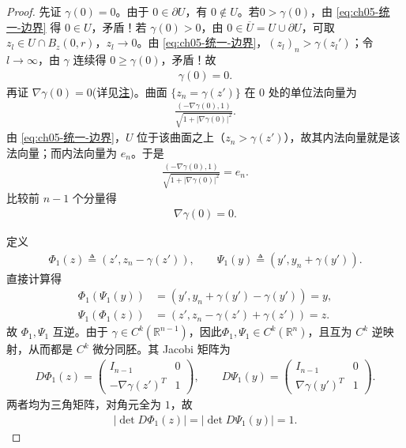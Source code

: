 \documentclass[../../main.tex]{subfiles}
\begin{document}
\begin{proof}
先证 $\gamma(0)=0$。由于 $0\in\partial U$，有 $0\notin U$。若$0>\gamma(0)$，由 \eqref{eq:ch05-统一-边界} 得 $0\in U$，矛盾！若 $\gamma(0)>0$，由 $0\in\overline{U}=U\cup \partial U$，可取 $z_l\in U\cap B_z(0,r)$，$z_l\to0$。由 \eqref{eq:ch05-统一-边界}，$(z_l)_n>\gamma(z_l')$；令 $l\to\infty$，由 $\gamma$ 连续得 $0\geqslant\gamma(0)$，矛盾！故
\begin{align}
\gamma(0)=0.
\label{eq:ch05-统一-gamma0}
\end{align}
再证 $\nabla\gamma(0)=0$(详见\hyperref[曲面的单位法向量选取]{注})。曲面 $\{z_n=\gamma(z')\}$ 在 $0$ 处的单位法向量为
\begin{align*}
\frac{(-\nabla\gamma(0),1)}{\sqrt{1+|\nabla\gamma(0)|^{2}}}.
\end{align*}
由 \eqref{eq:ch05-统一-边界}，$U$ 位于该曲面之上（$z_n>\gamma(z')$），故其内法向量就是该法向量；而内法向量为 $e_n$。于是
\begin{align*}
\frac{(-\nabla\gamma(0),1)}{\sqrt{1+|\nabla\gamma(0)|^{2}}}=e_n.
\end{align*}
比较前 $n-1$ 个分量得
\begin{align}
\nabla\gamma(0)=0.
\label{eq:ch05-统一-gradgamma0}
\end{align}

定义
\begin{align*}
\Phi_1(z)\triangleq\left(z',z_n-\gamma(z')\right),\qquad
\Psi_1(y)\triangleq\left(y',y_n+\gamma(y')\right).
\end{align*}
直接计算得
\begin{align*}
\Phi_1(\Psi_1(y))&=\left(y',y_n+\gamma(y')-\gamma(y')\right)=y,\\
\Psi_1(\Phi_1(z))&=\left(z',z_n-\gamma(z')+\gamma(z')\right)=z.
\end{align*}
故 $\Phi_1,\Psi_1$ 互逆。由于 $\gamma\in C^{k}(\mathbb{R}^{n-1})$，因此$\Phi_1,\Psi_1\in C^{k}(\mathbb{R}^{n})$，且互为 $C^{k}$ 逆映射，从而都是 $C^{k}$ 微分同胚。其 Jacobi 矩阵为
\begin{align*}
D\Phi_1(z)=
\begin{pmatrix}
I_{n-1} & 0\\
-\nabla\gamma(z')^{T} & 1
\end{pmatrix},
\qquad
D\Psi_1(y)=
\begin{pmatrix}
I_{n-1} & 0\\
\nabla\gamma(y')^{T} & 1
\end{pmatrix}.
\end{align*}
两者均为三角矩阵，对角元全为 $1$，故
\begin{align}
|\det D\Phi_1(z)|=|\det D\Psi_1(y)|=1.
\label{eq:ch05-统一-det1}
\end{align}


\end{proof}
\end{document}

